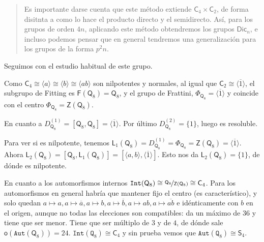 \documentclass[12pt,a4paper,fleqn,spanish,final,openright]{extbook}
\theoremstyle{definition}
\theoremstyle{remark}
\begin{document}
	\begin{quote}
		Es importante darse cuenta que este método extiende $\mathsf{C}_{4}   \times   \mathsf{C}_{2}$, de forma disitnta a como lo hace el producto directo y el semidirecto. Así, para los grupos de orden $4n$, aplicando este método obtendremos los grupos $\mathsf{Dic}_{n}$, e incluso podemos pensar que en general tendremos una generalización para los grupos de la forma $p^2 n$.
	\end{quote}



	Seguimos con el estudio habitual de este grupo.

    Como $\mathsf{C}_{4}   \cong   \langle a\rangle   \cong   \langle b\rangle   \cong   \langle ab\rangle$ son nilpotentes y normales, al igual que $\mathsf{C}_{2}   \cong   \langle\overline{1}\rangle$, el subgrupo de Fitting es $\mathsf{F}(\mathsf{Q}_8)=\mathsf{Q}_8$, y el grupo de Frattini, $\Phi_{\mathsf{Q}_8}=\langle \overline{1}\rangle$ y coincide con el centro $\Phi_{\mathsf{Q}_8}=\mathsf{Z}(\mathsf{Q}_8)$.

    En cuanto a $D_{\mathsf{Q}_8}^{(1)}=\left[{\mathsf{Q}_8,\mathsf{Q}_8}\right]=\langle \overline{1}\rangle$. Por último $D_{\mathsf{Q}_8}^{(2)}=\{1\}$, luego es resoluble.

    Para ver si es nilpotente, tenemos $\mathsf{L}_{1}(\mathsf{Q}_8)=D_{\mathsf{Q}_8}^{(1)}=\Phi_{\mathsf{Q}_8}=\mathsf{Z}(\mathsf{Q}_8)=\langle{\overline{1}}\rangle$. Ahora $\mathsf{L}_{2}(\mathsf{Q}_8)=\left[\mathsf{Q}_8,\mathsf{L}_1(\mathsf{Q}_8)\right]=\left[\langle{a,b}\rangle,\langle{\overline{1}}\rangle\right]$. Esto nos da $\mathsf{L}_{2}(\mathsf{Q}_8)=\{1\}$, de dónde es nilpotente.

    En cuanto a los automorfismos internos $\mathtt{Int}(\mathsf{Q}_8)   \cong    \nicefrac{\mathsf{Q}_8}{\mathsf{Z}(\mathsf{Q}_8)}   \cong   \mathsf{C}_4$. Para los automorfismos en general habría que mantener fijo el centro (es característico), y solo quedan $a   \mapsto a,a   \mapsto \overline{a},a   \mapsto b,a   \mapsto \overline{b},a   \mapsto {ab},a   \mapsto \overline{ab}$ e idénticamente con $b$ en el origen, aunque no todas las elecciones son compatibles: da un máximo de $36$ y tiene que ser menor. Tiene que ser múltiplo de $3$ y de $4$, de dónde sale $\mathsf{o}\left(\mathtt{Aut}(\mathsf{Q}_8)\right)=24$. $\mathtt{Int}(\mathtt{Q}_8)   \cong   \mathsf{C}_4$ y sin prueba vemos que $\mathtt{Aut}(\mathtt{Q}_8)   \cong   \mathsf{S}_4$.
\end{document}
